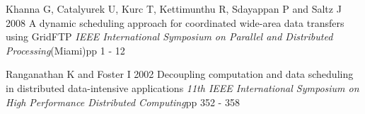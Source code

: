 \documentclass[a4paper,10pt]{article}
\begin{document}
\begin{thebibliography}{9}
Khanna G, Catalyurek U, Kurc T, Kettimunthu R, Sdayappan P and Saltz J 2008
A dynamic scheduling approach for coordinated wide-area data transfers using GridFTP
\textit{IEEE International Symposium on Parallel and Distributed Processing}(Miami)pp 1 - 12

Ranganathan K and Foster I 2002
Decoupling computation and data scheduling in distributed data-intensive applications
\textit{11th IEEE International Symposium on High Performance Distributed Computing}pp 352 - 358


\end{thebibliography}
\end{document}
